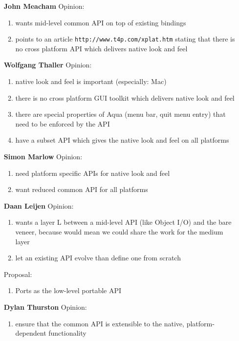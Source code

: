 \documentclass{article}
\newcommand{\Party}[1]{\stepcounter{enumi}\arabic{enumi} \bf #1}
\begin{document}
\begin{enumerate}
\item[\Party{John Meacham}] Opinion:
  \begin{enumerate}
  \item \label{midjm} wants mid-level common API on top of existing bindings
  \item \label{feeljm} points to an article
    \verb+http://www.t4p.com/xplat.htm+ stating that there is no cross
    platform API which delivers native look and feel
  \end{enumerate}
\item[\Party{Wolfgang Thaller}] Opinion:
  \begin{enumerate}
  \item native look and feel is important (especially: Mac)
  \item \label{feelwt} there is no cross platform GUI toolkit which
    delivers native look and feel
  \item \label{lookwt} there are special properties of Aqua (menu bar,
    quit menu entry) that need to be enforced by the API
  \item \label{interwt} have a subset API which gives the native look
    and feel on all platforms
  \end{enumerate}
\item[\Party{Simon Marlow}] Opinion:
  \begin{enumerate}
  \item \label{hindersm} need platform specific APIs for native look and feel
  \item \label{intersm} want reduced common API for all platforms
  \end{enumerate}
\item[\Party{Daan Leijen}] Opinion:
  \begin{enumerate}
  \item wants a layer L between a mid-level API (like Object I/O) and
    the bare veneer, because would mean we could share the work for
    the medium layer
  \item \label{scratchdl} let an existing API evolve than define one
    from scratch
  \end{enumerate}
  Proposal:
  \begin{enumerate}
  \item Ports as the low-level portable API
  \end{enumerate}

\item[\Party{Dylan Thurston}] Opinion:
  \begin{enumerate}
  \item \label{hinderdt} ensure that the common API is extensible to the
    native, platform-dependent functionality
  \end{enumerate}

\end{enumerate}
\end{document}
